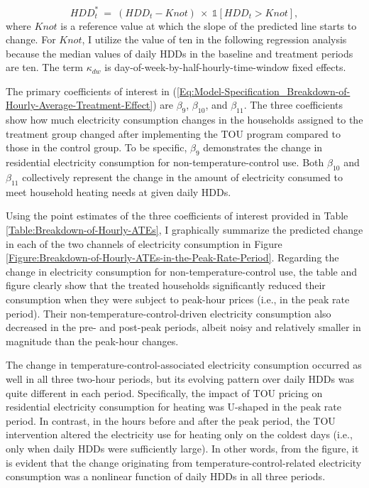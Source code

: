 \begin{equation}
HDD_{t}^{*} \ = \ (HDD_{t} - Knot) \ \times \ \mathbb{1}[HDD_{t} > Knot],
\end{equation}
where $Knot$ is a reference value at which the slope of the predicted line starts to change. For $Knot$, I utilize the value of ten in the following regression analysis because the median values of daily HDDs in the baseline and treatment periods are ten. The term $\kappa_{dw}$ is day-of-week-by-half-hourly-time-window fixed effects. 

The primary coefficients of interest in (\ref{Eq:Model-Specification_Breakdown-of-Hourly-Average-Treatment-Effect}) are $\beta_{9}$, $\beta_{10}$, and $\beta_{11}$. The three coefficients show how much electricity consumption changes in the households assigned to the treatment group changed after implementing the TOU program compared to those in the control group. To be specific, $\beta_{9}$ demonstrates the change in residential electricity consumption for non-temperature-control use. Both $\beta_{10}$ and $\beta_{11}$ collectively represent the change in the amount of electricity consumed to meet household heating needs at given daily HDDs. 

Using the point estimates of the three coefficients of interest provided in Table \ref{Table:Breakdown-of-Hourly-ATEs}, I graphically summarize the predicted change in each of the two channels of electricity consumption in Figure \ref{Figure:Breakdown-of-Hourly-ATEs-in-the-Peak-Rate-Period}. Regarding the change in electricity consumption for non-temperature-control use, the table and figure clearly show that the treated households significantly reduced their consumption when they were subject to peak-hour prices (i.e., in the peak rate period). Their non-temperature-control-driven electricity consumption also decreased in the pre- and post-peak periods, albeit noisy and relatively smaller in magnitude than the peak-hour changes. 

The change in temperature-control-associated electricity consumption occurred as well in all three two-hour periods, but its evolving pattern over daily HDDs was quite different in each period. Specifically, the impact of TOU pricing on residential electricity consumption for heating was U-shaped in the peak rate period. In contrast, in the hours before and after the peak period, the TOU intervention altered the electricity use for heating only on the coldest days (i.e., only when daily HDDs were sufficiently large). In other words, from the figure, it is evident that the change originating from temperature-control-related electricity consumption was a nonlinear function of daily HDDs in all three periods.

